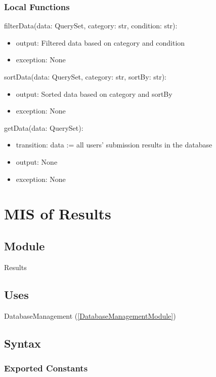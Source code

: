 \documentclass[12pt, titlepage]{article}
\begin{document}
\subsubsection{Local Functions}

\noindent filterData(data: QuerySet, category: str, condition: str):
\begin{itemize}
\item output: Filtered data based on category and condition
\item exception: None
\end{itemize}

\noindent sortData(data: QuerySet, category: str, sortBy: str):
\begin{itemize}
\item output: Sorted data based on category and sortBy
\item exception: None
\end{itemize}

\noindent getData(data: QuerySet):
\begin{itemize}
\item transition: data := all users' submission results in the database
\item output: None
\item exception: None
\end{itemize}

\newpage

\section{MIS of Results} \label{ResultsModule}

\subsection{Module}

Results

\subsection{Uses}

DatabaseManagement (\ref{DatabaseManagementModule})

\subsection{Syntax}

\subsubsection{Exported Constants}
\end{document}

